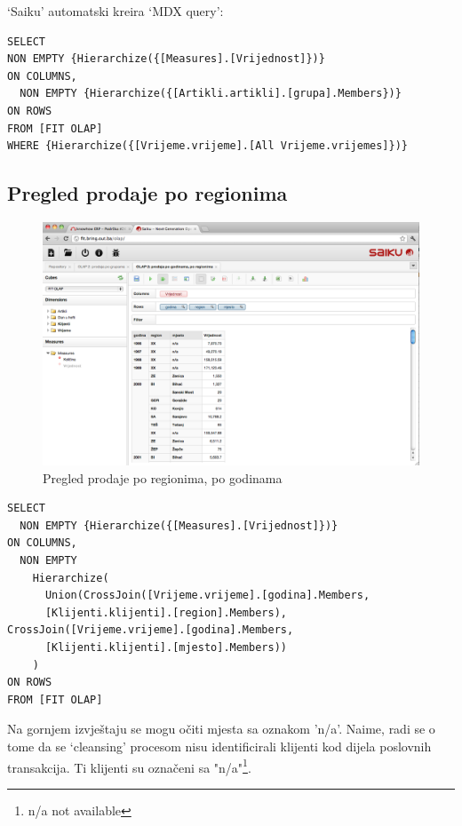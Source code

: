 \documentclass[times, utf8, seminar]{fit}
\begin{document}
`Saiku' automatski kreira `MDX query':

\begin{lstlisting}
SELECT
NON EMPTY {Hierarchize({[Measures].[Vrijednost]})} 
ON COLUMNS,
  NON EMPTY {Hierarchize({[Artikli.artikli].[grupa].Members})} 
ON ROWS
FROM [FIT OLAP]
WHERE {Hierarchize({[Vrijeme.vrijeme].[All Vrijeme.vrijemes]})}
\end{lstlisting}

\subsection{Pregled prodaje po regionima}

\begin{figure}[H]
\centering
\includegraphics[width=15cm]{img/saiku_rpt_region}
\caption{Pregled prodaje po regionima, po godinama}
\end{figure}

\begin{lstlisting}
SELECT
  NON EMPTY {Hierarchize({[Measures].[Vrijednost]})} 
ON COLUMNS,
  NON EMPTY 
    Hierarchize(
      Union(CrossJoin([Vrijeme.vrijeme].[godina].Members, 
      [Klijenti.klijenti].[region].Members), CrossJoin([Vrijeme.vrijeme].[godina].Members, 
      [Klijenti.klijenti].[mjesto].Members))
    ) 
ON ROWS
FROM [FIT OLAP]
\end{lstlisting}

Na gornjem izvještaju se mogu očiti mjesta sa oznakom 'n/a'. Naime, radi se o tome da se `cleansing' procesom nisu identificirali klijenti kod dijela poslovnih transakcija. Ti klijenti su označeni sa "n/a"\footnote{n/a not available}.
\end{document}

